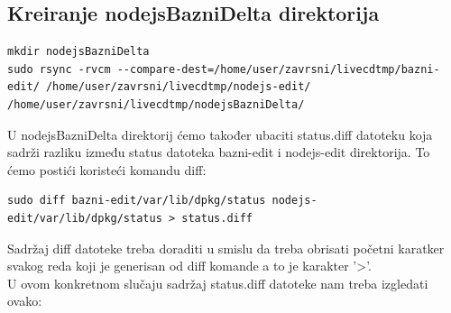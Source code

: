 \documentclass[12pt,vi]{mitthesis}
\begin{document}
\subsection*{Kreiranje nodejsBazniDelta direktorija}
\begin{lstlisting}[style=BashInputStyle]
mkdir nodejsBazniDelta
sudo rsync -rvcm --compare-dest=/home/user/zavrsni/livecdtmp/bazni-edit/ /home/user/zavrsni/livecdtmp/nodejs-edit/ /home/user/zavrsni/livecdtmp/nodejsBazniDelta/
\end{lstlisting}
\indent
U nodejsBazniDelta direktorij ćemo također ubaciti status.diff datoteku koja sadrži razliku između status datoteka bazni-edit i nodejs-edit direktorija. To ćemo postići koristeći komandu diff:
\begin{lstlisting}[style=BashInputStyle]
sudo diff bazni-edit/var/lib/dpkg/status nodejs-edit/var/lib/dpkg/status > status.diff
\end{lstlisting}
Sadržaj diff datoteke treba doraditi u smislu da treba obrisati početni karatker svakog reda koji je generisan od diff komande a to je karakter '>'.\\
U ovom konkretnom slučaju sadržaj status.diff datoteke nam treba izgledati ovako:
\end{document}
